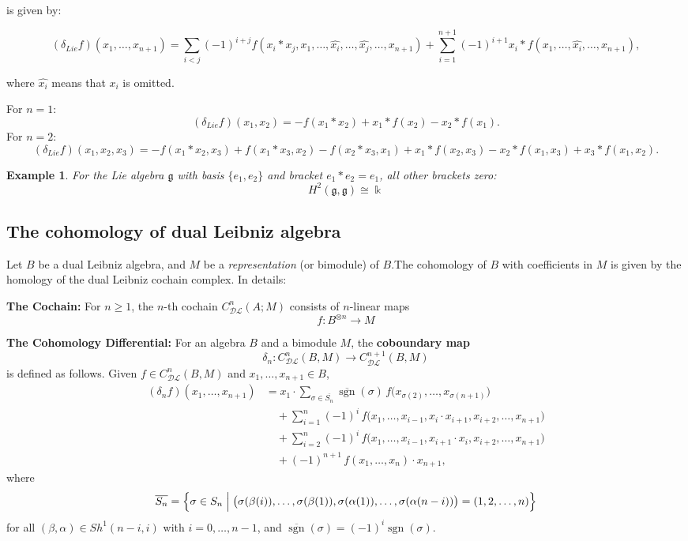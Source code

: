 \documentclass[a4paper, 12pt,oneside,reqno]{amsart}
\newcommand{\DL}{\mathcal{DL}}
\newcommand{\cochain}[2]{C^{#1}_{\DL}(#2)}
\newtheorem{example}[theorem]{Example}
\begin{document}
is given by:

\[
(\delta_{Lie}f)(x_1, \ldots, x_{n+1}) = \sum_{i < j} (-1)^{i+j} f(x_i\ast x_j, x_1, \ldots, \hat{x_i}, \ldots, \hat{x_j}, \ldots, x_{n+1}) + \sum_{i=1}^{n+1} (-1)^{i+1} x_i \ast f(x_1, \ldots, \hat{x_i}, \ldots, x_{n+1}),
\]

where \( \hat{x_i} \) means that \( x_i \) is omitted.

For $n=1$:
\[
(\delta_{Lie}f)(x_1, x_2) = -f(x_1\ast x_2) + x_1 \ast f(x_2) - x_2 \ast f(x_1).
\]
For $n=2$:
\[
(\delta_{Lie}f)(x_1, x_2, x_3) = -f(x_1\ast x_2, x_3) + f(x_1\ast x_3, x_2) - f(x_2\ast x_3, x_1) 
+ x_1 \ast f(x_2, x_3) - x_2 \ast f(x_1, x_3) + x_3 \ast f(x_1, x_2).
\]
\begin{example}
    

For the Lie algebra \(\mathfrak{g}\) with basis \(\{e_1, e_2\}\) and bracket \(e_1\ast e_2= e_1\), all other brackets zero: \[H^2(\mathfrak{g},\mathfrak{g}) \cong \Bbbk\]
\end{example}
\subsection{The cohomology of dual Leibniz algebra}\cite{Loday, LodayVallette, Yau}
Let \( B \) be a dual Leibniz algebra, and \( M \) be a \emph{representation} (or bimodule) of \( B \).The cohomology of \( B \) with coefficients in \( M \) is given by the homology of the {dual Leibniz cochain complex}. In details:

\textbf{The Cochain:} For \( n \geq 1 \), the \( n \)-th cochain  \( \cochain{n}{A; M} \) consists of \( n \)-linear maps 
\[
f: B^{\otimes n} \to M
\]




\textbf{The Cohomology Differential:} For an algebra $B$ and a bimodule $M$, the \textbf{coboundary map}
\[
\delta_n \colon \cochain{n}{B,M} \to \cochain{n+1}{B,M}
\]
is defined as follows. Given $f \in \cochain{n}{B,M}$ and $x_1,\dots,x_{n+1} \in B$,
\begin{align}
(\delta_n f)(x_1,\dots,x_{n+1})
&= x_1 \cdot \sum_{\sigma\in \overline{S_n}} \overline{\operatorname{sgn}}(\sigma)\,
   f\bigl(x_{\sigma(2)},\dots,x_{\sigma(n+1)}\bigr) \nonumber\\
&\quad +\sum_{i=1}^{n} (-1)^i\,
   f\bigl(x_1,\dots,x_{i-1},x_i\cdot x_{i+1},x_{i+2},\dots,x_{n+1}\bigr) \nonumber\\
&\quad +\sum_{i=2}^{n} (-1)^i\,
   f\bigl(x_1,\dots,x_{i-1},x_{i+1}\cdot x_i,x_{i+2},\dots,x_{n+1}\bigr) \nonumber\\
&\quad + (-1)^{n+1}\, f(x_1,\dots,x_n) \cdot x_{n+1},
\label{eq:diff}
\end{align}
where
\[
\overline{S_n}= \Bigl\{\sigma\in S_n \;\Big|\;
\bigl(\sigma(\beta(i)),\dots,\sigma(\beta(1)),\sigma(\alpha(1)),\dots,\sigma(\alpha(n-i))\bigr)
= (1,2,\dots,n) \Bigr\}
\]
for all $(\beta,\alpha)\in Sh^1(n-i,i)$ with $i=0,\dots,n-1$, and
$\overline{\operatorname{sgn}}(\sigma)=(-1)^i \operatorname{ sgn}(\sigma)$.
\end{document}
